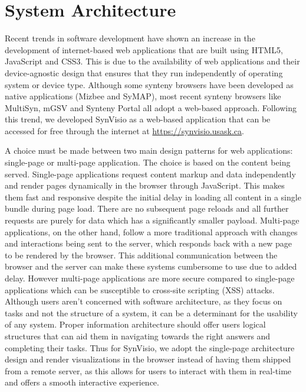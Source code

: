 \section{System Architecture}

Recent trends in software development have shown an increase in the development of internet-based web applications that are built using HTML5, JavaScript and CSS3. This is due to the availability of web applications and their device-agnostic design that ensures that they run independently of operating system or device type. Although some synteny browsers have been developed as native applications (Mizbee and SyMAP\cite{Meyer2009,soderlund2011symap}), most recent synteny browsers like MultiSyn, mGSV and Synteny Portal\cite{baek2016multisyn,revanna2011gsv,lee2016syntenyportal} all adopt a web-based approach. Following this trend, we developed SynVisio as a web-based application that can be accessed for free through the internet at \url{https://synvisio.usask.ca}.

A choice must be made between two main design patterns for web applications: single-page or multi-page application. The choice is based on the content being served. Single-page applications request content markup and data independently and render pages dynamically in the browser through JavaScript. This makes them fast and responsive despite the initial delay in loading all content in a single bundle during page load. There are no subsequent page reloads and all further requests are purely for data which has a significantly smaller payload. Multi-page applications, on the other hand, follow a more traditional approach with changes and interactions being sent to the server, which responds back with a new page to be rendered by the browser. This additional communication between the browser and the server can make these systems cumbersome to use due to added delay. However multi-page applications are more secure compared to single-page applications which can be susceptible to cross-site scripting (XSS) attacks.
Although users aren't concerned with software architecture, as they focus on tasks and not the structure of a system, it can be a determinant for the usability of any system. Proper information architecture should offer users logical structures that can aid them in navigating towards the right answers and completing their tasks\cite{rosenfeld2002information}. Thus for SynVisio, we adopt the single-page architecture design and render visualizations in the browser instead of having them shipped from a remote server, as this allows for users to interact with them in real-time and offers a smooth interactive experience\cite{nielsen2010visualizing}. 

